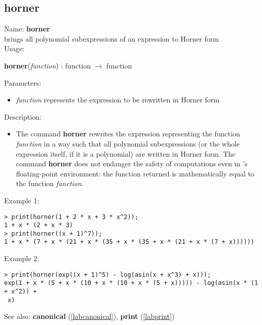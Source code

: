\subsection{horner}
\label{labhorner}
\noindent Name: \textbf{horner}\\
brings all polynomial subexpressions of an expression to Horner form\\
\noindent Usage: 
\begin{center}
\textbf{horner}(\emph{function}) : \textsf{function} $\rightarrow$ \textsf{function}\\
\end{center}
Parameters: 
\begin{itemize}
\item \emph{function} represents the expression to be rewritten in Horner form
\end{itemize}
\noindent Description: \begin{itemize}

\item The command \textbf{horner} rewrites the expression representing the function
   \emph{function} in a way such that all polynomial subexpressions (or the
   whole expression itself, if it is a polynomial) are written in Horner
   form.  The command \textbf{horner} does not endanger the safety of
   computations even in \sollya's floating-point environment: the
   function returned is mathematically equal to the function \emph{function}.
\end{itemize}
\noindent Example 1: 
\begin{center}\begin{minipage}{15cm}\begin{Verbatim}[frame=single]
> print(horner(1 + 2 * x + 3 * x^2));
1 + x * (2 + x * 3)
> print(horner((x + 1)^7));
1 + x * (7 + x * (21 + x * (35 + x * (35 + x * (21 + x * (7 + x))))))
\end{Verbatim}
\end{minipage}\end{center}
\noindent Example 2: 
\begin{center}\begin{minipage}{15cm}\begin{Verbatim}[frame=single]
> print(horner(exp((x + 1)^5) - log(asin(x + x^3) + x)));
exp(1 + x * (5 + x * (10 + x * (10 + x * (5 + x))))) - log(asin(x * (1 + x^2)) +
 x)
\end{Verbatim}
\end{minipage}\end{center}
See also: \textbf{canonical} (\ref{labcanonical}), \textbf{print} (\ref{labprint})
